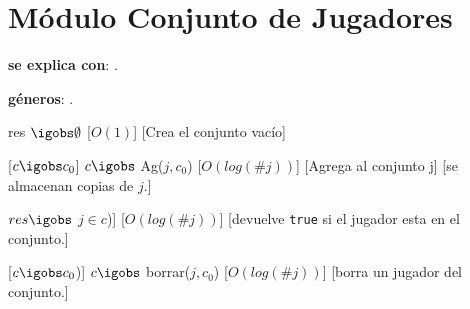 \section{Módulo Conjunto de Jugadores}



\begin{Interfaz}
	\textbf{se explica con}: . 

	\textbf{géneros}: .


	{res $\igobs \emptyset$ }
	[$O(1)$]
	[Crea el conjunto vacío]

	[$c \igobs c_0$]
	{$c \igobs$ Ag($j, c_0$)}
	[$O(log(\#j))$]
	[Agrega al conjunto j]
	[se almacenan copias de $j$.]

	{$res \igobs$ $j \in c$)]}
	[$O(log(\#j))$]
	[devuelve \texttt{true} si el jugador esta en el conjunto.]

	[$c \igobs c_0$)]
	{$c \igobs$ borrar($j, c_0$)}
	[$O(log(\#j))$]
	[borra un jugador del conjunto.]

\end{Interfaz}


